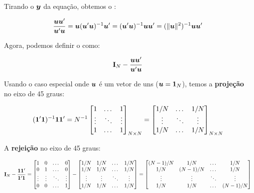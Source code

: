 \documentclass[11pt, oneside, a4paper, article]{article}
\numberwithin{equation}{section}
\begin{document}
\begin{description}
\noindent
Tirando o $\boldsymbol{y}$ da equação, obtemos o  :

\vspace{-1 em}
\begin{align*}
\frac{\boldsymbol{u} \boldsymbol{u}'}{\boldsymbol{u}'\boldsymbol{u}} 
=
\boldsymbol{u}(\boldsymbol{u}'\boldsymbol{u})^{-1} \boldsymbol{u}'
=
(\boldsymbol{u}'\boldsymbol{u})^{-1} \boldsymbol{u} \boldsymbol{u}'
=
(\|\boldsymbol{u} \|^2)^{-1} \boldsymbol{u} \boldsymbol{u}'
\end{align*}

Agora, podemos definir o  como:

\vspace{-1 em}
\begin{align*}
\mathbf{I}_{N} - \frac{\boldsymbol{u} \boldsymbol{u}'}{\boldsymbol{u}'\boldsymbol{u}} 
\end{align*}

Usando o caso especial onde $\boldsymbol{u}$ é um vetor de uns ($\boldsymbol{u} = \boldsymbol{1}_{N}$), temos a \textbf{projeção} no eixo de 45 graus:

\vspace{-1 em}
\begin{align*}
(\boldsymbol{1}'\boldsymbol{1})^{-1} \boldsymbol{1} \boldsymbol{1}'
=
N^{-1} 
\begin{bmatrix}
	1      & \dots  & 1	 \\
	\vdots & \ddots & \vdots \\
	1      & \dots  & 1	
\end{bmatrix}_{N \times N}
=
\begin{bmatrix}
	1/N    & \dots  & 1/N	 \\
	\vdots & \ddots & \vdots \\
	1/N    & \dots  & 1/N	
\end{bmatrix}_{N \times N}
\end{align*}

A \textbf{rejeição} no eixo de 45 graus:

\vspace{-1 em}
\begin{align*}
\mathbf{I}_{N} - \frac{\boldsymbol{1} \boldsymbol{1}'}{\boldsymbol{1}'\boldsymbol{1}} 
=
\begin{bmatrix}
	1      & 0 &\dots  & 0	 \\
	0      & 1 &\dots  & 0	 \\
	\vdots & \vdots & \ddots & \vdots\\
	0      & 0 & \dots  & 1	
\end{bmatrix}
-
\begin{bmatrix}
	1/N    & 1/N    & \dots  & 1/N	 \\
	1/N    & 1/N    & \dots  & 1/N	 \\
	\vdots & \vdots & \ddots & \vdots \\
	1/N    & 1/N    & \dots  & 1/N	
\end{bmatrix}
=
\begin{bmatrix}
(N-1)/N & 1/N     & \dots  & 1/N    \\
1/N     & (N-1)/N & \dots  & 1/N    \\
\vdots  & \vdots  & \ddots & \vdots \\
1/N     & 1/N     & \dots  & (N-1)/N	
\end{bmatrix}
\end{align*}


\end{description}
\end{document}
